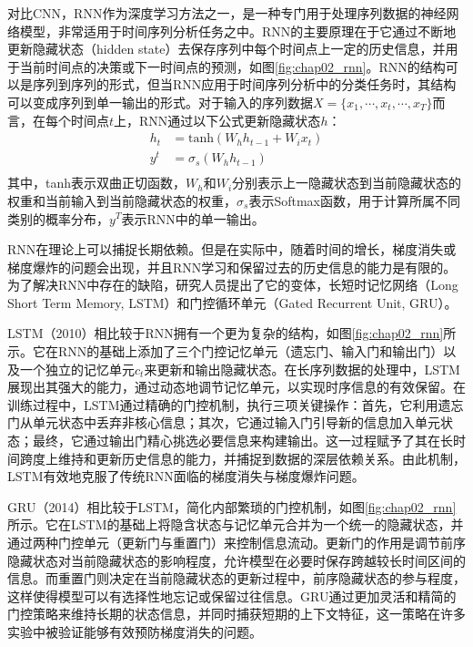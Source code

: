 对比CNN，RNN作为深度学习方法之一，是一种专门用于处理序列数据的神经网络模型，非常适用于时间序列分析任务之中。RNN的主要原理在于它通过不断地更新隐藏状态（hidden state）去保存序列中每个时间点上一定的历史信息，并用于当前时间点的决策或下一时间点的预测，如图\ref{fig:chap02_rnn}。RNN的结构可以是序列到序列的形式，但当RNN应用于时间序列分析中的分类任务时，其结构可以变成序列到单一输出的形式。对于输入的序列数据\(X = \{x_1, \cdots, x_t, \cdots, x_T\}\)而言，在每个时间点\(t\)上，RNN通过以下公式更新隐藏状态\(h\)：
\begin{equation}
    \begin{aligned}
        h_t & = \text{tanh}(W_{h}h_{t-1}+ W_{i}x_t) \\
        y^t & = \sigma_s(W_{h}h_{t-1})              \\
    \end{aligned}
\end{equation}
其中，tanh表示双曲正切函数，\(W_h\)和\(W_i\)分别表示上一隐藏状态到当前隐藏状态的权重和当前输入到当前隐藏状态的权重，\(\sigma_s\)表示Softmax函数，用于计算所属不同类别的概率分布，\(y^T\)表示RNN中的单一输出。

RNN在理论上可以捕捉长期依赖。但是在实际中，随着时间的增长，梯度消失或梯度爆炸的问题会出现，并且RNN学习和保留过去的历史信息的能力是有限的。为了解决RNN中存在的缺陷，研究人员提出了它的变体，长短时记忆网络（Long Short Term Memory, LSTM）\cite{memory2010long}和门控循环单元（Gated Recurrent Unit, GRU）\cite{chung2014empirical}。

LSTM\cite{memory2010long}（2010）相比较于RNN拥有一个更为复杂的结构，如图\ref{fig:chap02_rnn}所示。它在RNN的基础上添加了三个门控记忆单元（遗忘门、输入门和输出门）以及一个独立的记忆单元\(c_t\)来更新和输出隐藏状态。在长序列数据的处理中，LSTM展现出其强大的能力，通过动态地调节记忆单元，以实现时序信息的有效保留。在训练过程中，LSTM通过精确的门控机制，执行三项关键操作：首先，它利用遗忘门从单元状态中丢弃非核心信息；其次，它通过输入门引导新的信息加入单元状态；最终，它通过输出门精心挑选必要信息来构建输出。这一过程赋予了其在长时间跨度上维持和更新历史信息的能力，并捕捉到数据的深层依赖关系。由此机制，LSTM有效地克服了传统RNN面临的梯度消失与梯度爆炸问题。

GRU\cite{chung2014empirical}（2014）相比较于LSTM，简化内部繁琐的门控机制，如图\ref{fig:chap02_rnn}所示。它在LSTM的基础上将隐含状态与记忆单元合并为一个统一的隐藏状态，并通过两种门控单元（更新门与重置门）来控制信息流动。更新门的作用是调节前序隐藏状态对当前隐藏状态的影响程度，允许模型在必要时保存跨越较长时间区间的信息。而重置门则决定在当前隐藏状态的更新过程中，前序隐藏状态的参与程度，这样使得模型可以有选择性地忘记或保留过往信息。GRU通过更加灵活和精简的门控策略来维持长期的状态信息，并同时捕获短期的上下文特征，这一策略在许多实验中被验证能够有效预防梯度消失的问题。

